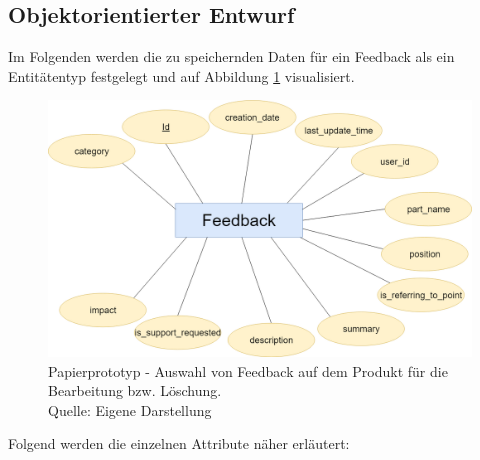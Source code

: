 \subsection{Objektorientierter Entwurf}\label{objentwurf}

Im Folgenden werden die zu speichernden Daten für ein Feedback als ein Entitätentyp festgelegt und auf Abbildung \ref{img:entitytype} visualisiert. 

\begin{figure}[H]
	\centering
	\includegraphics[width=.85\textwidth]{resources/conception/feedback_entitiy_type.png}
	\caption{Papierprototyp - Auswahl von Feedback auf dem Produkt für die Bearbeitung bzw. Löschung. \\Quelle: Eigene Darstellung}
	\label{img:entitytype}
\end{figure}

Folgend werden die einzelnen Attribute näher erläutert: 

